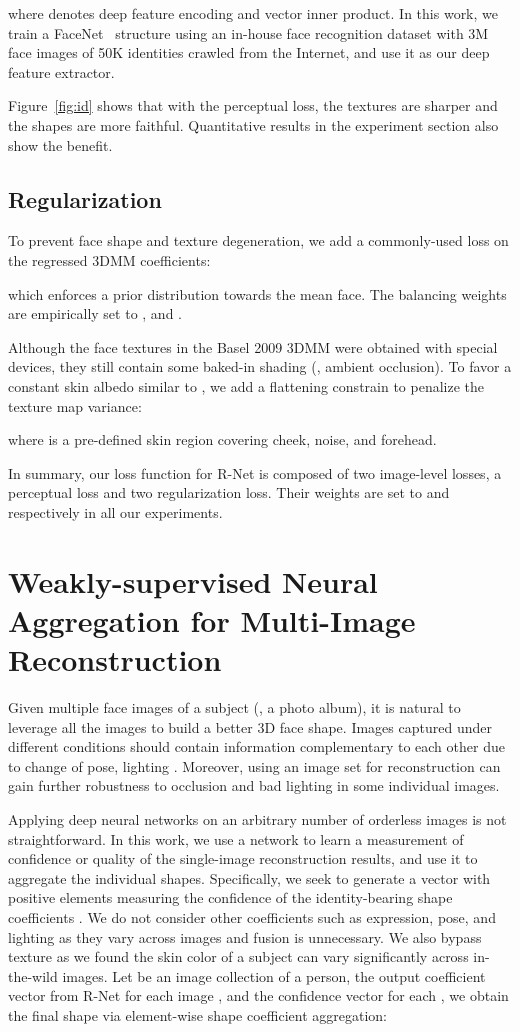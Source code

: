 \documentclass[10pt,twocolumn,letterpaper]{article}
\begin{document}
where  denotes deep feature encoding and  vector inner product. In this work, we train a FaceNet~\cite{schroff2015facenet} structure using an in-house face recognition dataset with 3M face images of 50K identities crawled from the Internet, and use it as our deep feature extractor.

Figure~\ref{fig:id} shows that with the perceptual loss, the textures are sharper and the shapes are more faithful. Quantitative results in the experiment section also show the benefit.

\subsection{Regularization}
To prevent face shape and texture degeneration, we add a commonly-used loss on the regressed 3DMM coefficients:

which enforces a prior distribution towards the mean face. The balancing weights are empirically set to ,   and .

Although the face textures in the Basel 2009 3DMM \cite{paysan20093d} were obtained with special devices, they still contain some baked-in shading (\eg, ambient occlusion). To favor a constant skin albedo similar to \cite{tewari2018self}, we add a flattening constrain to penalize the texture map variance:


where  is a pre-defined skin region covering cheek, noise, and forehead. 

In summary, our loss function  for R-Net is composed of two image-level losses, a perceptual loss and two regularization loss. Their weights are set to  and  respectively in all our experiments.

\section{Weakly-supervised Neural Aggregation for Multi-Image Reconstruction}

Given multiple face images of a subject (\eg, a photo album), it is natural to leverage all the images to build a better 3D face shape. Images captured under different conditions should contain information complementary to each other due to change of pose, lighting \etc. Moreover, using an image set for reconstruction can gain further robustness to occlusion and bad lighting in some individual images.

Applying deep neural networks on an arbitrary number of orderless images is not straightforward. In this work, we use a network to learn a measurement of confidence or quality of the single-image reconstruction results, and use it to aggregate the individual shapes. Specifically, we seek to generate a vector  with positive elements measuring the confidence of the identity-bearing shape coefficients . We do not consider other coefficients such as expression, pose, and lighting as they vary across images and fusion is unnecessary. We also bypass texture as we found the skin color of a subject can vary significantly across in-the-wild images. Let  be an image collection of a person,  the output coefficient vector from R-Net for each image , and  the confidence vector for each , we obtain the final shape via element-wise shape coefficient aggregation:
\end{document}
